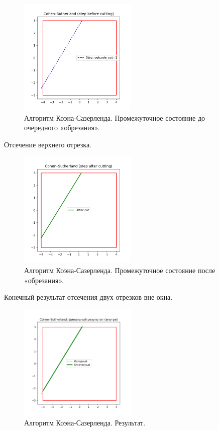\documentclass[areasetadvanced]{scrartcl}
\begin{document}
\begin{figure}[H]
    \centering
    \includegraphics[width=0.5\textwidth]{../images/cohen_step_3_before.png}
    \caption{Алгоритм Коэна-Сазерленда. Промежуточное состояние до очередного «обрезания».}
    \label{fig:cohen_step3}
\end{figure}
Отсечение верхнего отрезка. 
\begin{figure}[H]
    \centering
    \includegraphics[width=0.5\textwidth]{../images/cohen_step_4_after.png}
    \caption{Алгоритм Коэна-Сазерленда. Промежуточное состояние после «обрезания».}
    \label{fig:cohen_step4}
\end{figure}
Конечный результат отсечения двух отрезков вне окна.
\begin{figure}[H]
    \centering
    \includegraphics[width=0.5\textwidth]{../images/cohen_final_result.png}
    \caption{Алгоритм Коэна-Сазерленда. Результат.}
    \label{fig:cohen_final}
\end{figure}
\end{document}
